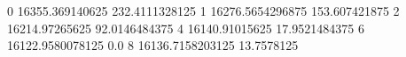 0 16355.369140625 232.4111328125
1 16276.5654296875 153.607421875
2 16214.97265625 92.0146484375
4 16140.91015625 17.9521484375
6 16122.9580078125 0.0
8 16136.7158203125 13.7578125
